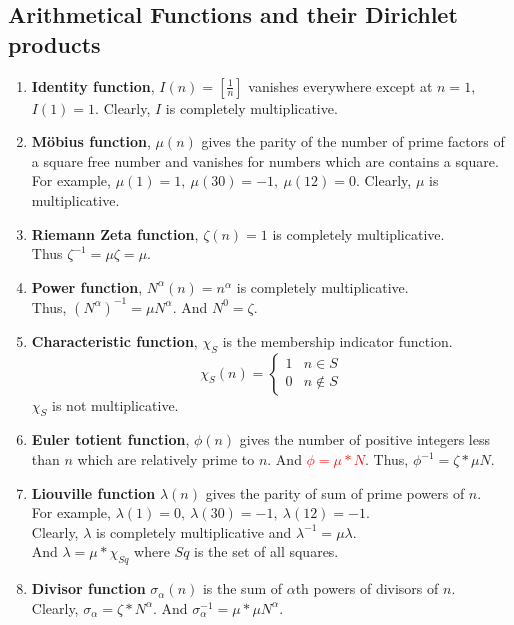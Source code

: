 \subsection{Arithmetical Functions and their Dirichlet products}
\begin{enumerate}
	\item \textbf{Identity function}, $I(n) = \left[\frac{1}{n}\right]$ vanishes everywhere except at $n = 1$, $I(1) = 1$.
	Clearly, $I$ is completely multiplicative.
	\item \textbf{M\"obius function}, $\mu(n)$ gives the parity of the number of prime factors of a square free number and vanishes for numbers which are contains a square.\\
	For example, $\mu(1) = 1,\ \mu(30) = -1,\ \mu(12) = 0$.
	Clearly, $\mu$ is multiplicative.
\item \textbf{Riemann Zeta function}, $\zeta(n) = 1$ is completely multiplicative.\\
	Thus $\zeta^{-1} = \mu \zeta = \mu$.
	\item \textbf{Power function}, $N^\alpha(n) = n^\alpha$ is completely multiplicative.\\
	Thus, $(N^\alpha)^{-1} = \mu N^\alpha$. And $N^0 = \zeta$.
	\item \textbf{Characteristic function}, $\chi_S$ is the membership indicator function.
	$$\chi_S(n) = \begin{cases} 1 & n \in S \\ 0 & n \notin S \end{cases}$$
	$\chi_S$ is not multiplicative.
	\item \textbf{Euler totient function}, $\phi(n)$ gives the number of positive integers less than $n$ which are relatively prime to $n$. And \textcolor{red}{$\phi = \mu \ast N$}. Thus, $\phi^{-1} = \zeta \ast \mu N$.
	\item \textbf{Liouville function} $\lambda(n)$ gives the parity of sum of prime powers of $n$.\\
	For example, $\lambda(1) = 0,\ \lambda(30)=-1,\ \lambda(12)=-1$.\\
	Clearly, $\lambda$ is completely multiplicative and $\lambda^{-1} = \mu \lambda$.\\
	And $\lambda = \mu \ast \chi_{Sq}$ where $Sq$ is the set of all squares.
	\item \textbf{Divisor function} $\sigma_\alpha(n)$ is the sum of $\alpha$th powers of divisors of $n$.\\ Clearly, $\sigma_\alpha = \zeta \ast N^\alpha$. And $\sigma_\alpha^{-1} = \mu \ast \mu N^\alpha$.

\end{enumerate}
